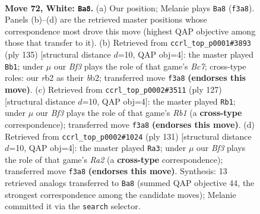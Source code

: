 \documentclass[11pt]{article}
\begin{document}
\clearpage

\begin{figure}[p]\centering
\begin{subfigure}{0.46\textwidth}\centering
\resizebox{\linewidth}{!}{%
\newchessgame
\chessboard[
  setfen={8/8/6k1/4p1p1/5p2/5B2/1r6/6K1 w - - 55 72},
  showmover=false,
  pgfstyle=straightmove, color=movearrow, markmove={f3-a8}
]}
\caption{}
\end{subfigure}\hfill
\begin{subfigure}{0.46\textwidth}\centering
\resizebox{\linewidth}{!}{%
\newchessgame
\chessboard[
  setfen={6k1/8/7p/7P/6P1/6K1/1Bb5/8 b - - 12 68},
  showmover=false,
  pgfstyle=straightmove, color=movearrow, markmove={c2-b1}
]}
\caption{}
\end{subfigure}
\\[4pt]
\begin{subfigure}{0.46\textwidth}\centering
\resizebox{\linewidth}{!}{%
\newchessgame
\chessboard[
  setfen={1r6/5k2/2R5/5p2/5P2/6P1/6K1/8 b - - 6 64},
  showmover=false,
  pgfstyle=straightmove, color=movearrow, markmove={b8-b1}
]}
\caption{}
\end{subfigure}\hfill
\begin{subfigure}{0.46\textwidth}\centering
\resizebox{\linewidth}{!}{%
\newchessgame
\chessboard[
  setfen={8/r7/6k1/2R5/5p2/5P2/6P1/6K1 b - - 16 66},
  showmover=false,
  pgfstyle=straightmove, color=movearrow, markmove={a7-a3}
]}
\caption{}
\end{subfigure}
\caption{\textbf{Move 72, White: \texttt{Ba8}.} (a) Our position; Melanie plays \texttt{Ba8} (\texttt{f3a8}). Panels (b)--(d) are the retrieved master positions whose correspondence most drove this move (highest QAP objective among those that transfer to it). (b) Retrieved from \texttt{ccrl\_top\_p0001\#3893} (ply 135) [structural distance $d$=10, QAP obj=4]: the master played \texttt{Bb1}; under $\mu$ our \emph{Bf3} plays the role of that game's \emph{Bc7}; cross-type roles: our \emph{r}b2 as their \emph{b}b2; transferred move \texttt{f3a8} \textbf{(endorses this move)}. (c) Retrieved from \texttt{ccrl\_top\_p0002\#3511} (ply 127) [structural distance $d$=10, QAP obj=4]: the master played \texttt{Rb1}; under $\mu$ our \emph{Bf3} plays the role of that game's \emph{Rb1} (a \textbf{cross-type} correspondence); transferred move \texttt{f3a8} \textbf{(endorses this move)}. (d) Retrieved from \texttt{ccrl\_top\_p0002\#1024} (ply 131) [structural distance $d$=10, QAP obj=4]: the master played \texttt{Ra3}; under $\mu$ our \emph{Bf3} plays the role of that game's \emph{Ra2} (a \textbf{cross-type} correspondence); transferred move \texttt{f3a8} \textbf{(endorses this move)}. Synthesis: 13 retrieved analogs transferred to \texttt{Ba8} (summed QAP objective 44, the strongest correspondence among the candidate moves); Melanie committed it via the \texttt{search} selector.}
\label{fig:thought-m142}
\end{figure}
\end{document}
